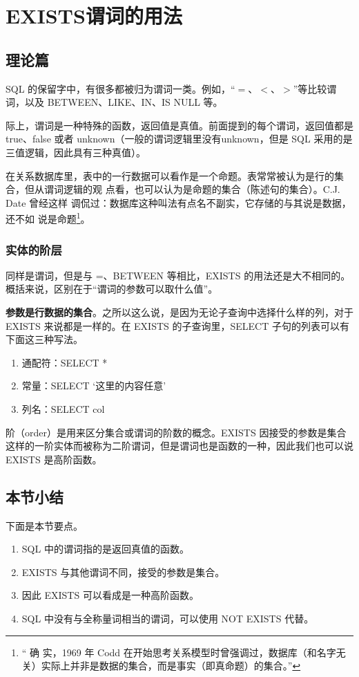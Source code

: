 \section{EXISTS谓词的用法}
\subsection{理论篇}
SQL 的保留字中，有很多都被归为谓词一类。例如，“$=$、$<$、$>$”等比较谓词，以及 BETWEEN、LIKE、IN、IS NULL 等。

际上，谓词是一种特殊的函数，返回值是真值。前面提到的每个谓词，返回值都是 true、false 或者 unknown（一般的谓词逻辑里没有unknown，但是 SQL 采用的是三值逻辑，因此具有三种真值）。

在关系数据库里，表中的一行数据可以看作是一个命题。表常常被认为是行的集合，但从谓词逻辑的观
点看，也可以认为是命题的集合（陈述句的集合）。C.J. Date 曾经这样
调侃过：数据库这种叫法有点名不副实，它存储的与其说是数据，还不如
说是命题\footnote{“ 确 实，1969 年 Codd 在开始思考关系模型时曾强调过，数据库（和名字无关）实际上并非是数据的集合，而是事实（即真命题）的集合。”}。
\subsubsection*{实体的阶层}
同样是谓词，但是与 =、BETWEEN 等相比，EXISTS 的用法还是大不相同的。概括来说，区别在于“谓词的参数可以取什么值”。


\textbf{参数是行数据的集合}。之所以这么说，是因为无论子查询中选择什么样的列，对于 EXISTS 来说都是一样的。在 EXISTS 的子查询里，SELECT 子句的列表可以有下面这三种写法。
\begin{enumerate}
    \item 通配符：SELECT *
    \item 常量：SELECT ‘这里的内容任意’
    \item 列名：SELECT col
\end{enumerate}


阶（order）是用来区分集合或谓词的阶数的概念。EXISTS 因接受的参数是集合这样的一阶实体而被称为二阶谓词，但是谓词也是函数的一种，因此我们也可以说EXISTS 是高阶函数。


\subsection{本节小结}
下面是本节要点。
\begin{enumerate}
    \item SQL 中的谓词指的是返回真值的函数。
    \item EXISTS 与其他谓词不同，接受的参数是集合。
    \item 因此 EXISTS 可以看成是一种高阶函数。
    \item SQL 中没有与全称量词相当的谓词，可以使用 NOT EXISTS 代替。
\end{enumerate}